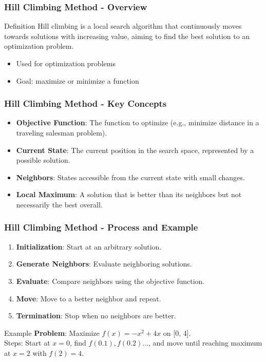\documentclass[aspectratio=169]{beamer}
\begin{document}
\begin{frame}[fragile]
    \frametitle{Hill Climbing Method - Overview}
    \begin{block}{Definition}
        Hill climbing is a local search algorithm that continuously moves towards solutions with increasing value, aiming to find the best solution to an optimization problem.
    \end{block}
    \begin{itemize}
        \item Used for optimization problems
        \item Goal: maximize or minimize a function
    \end{itemize}
\end{frame}

\begin{frame}[fragile]
    \frametitle{Hill Climbing Method - Key Concepts}
    \begin{itemize}
        \item \textbf{Objective Function}: The function to optimize (e.g., minimize distance in a traveling salesman problem).
        \item \textbf{Current State}: The current position in the search space, represented by a possible solution.
        \item \textbf{Neighbors}: States accessible from the current state with small changes.
        \item \textbf{Local Maximum}: A solution that is better than its neighbors but not necessarily the best overall.
    \end{itemize}
\end{frame}

\begin{frame}[fragile]
    \frametitle{Hill Climbing Method - Process and Example}
    \begin{enumerate}
        \item \textbf{Initialization}: Start at an arbitrary solution.
        \item \textbf{Generate Neighbors}: Evaluate neighboring solutions.
        \item \textbf{Evaluate}: Compare neighbors using the objective function.
        \item \textbf{Move}: Move to a better neighbor and repeat.
        \item \textbf{Termination}: Stop when no neighbors are better.
    \end{enumerate}
    
    \begin{block}{Example}
        \textbf{Problem}: Maximize \( f(x) = -x^2 + 4x \) on [0, 4]. \\
        Steps: Start at \( x=0 \), find \( f(0.1), f(0.2)... \), and move until reaching maximum at \( x=2 \) with \( f(2)=4 \).
    \end{block}
\end{frame}
\end{document}
